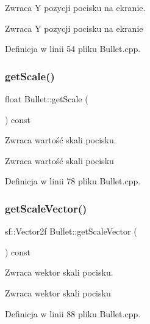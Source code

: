 Zwraca Y pozycji pocisku na ekranie. 

\begin{DoxyReturn}{Zwraca}
Y pozycji pocisku na ekranie 
\end{DoxyReturn}


Definicja w linii 54 pliku Bullet.\+cpp.

\mbox{\label{class_bullet_a252b146bfd709799990523fcbb0c6a4b}} 
\subsubsection{\texorpdfstring{get\+Scale()}{getScale()}}
{\footnotesize\ttfamily float Bullet\+::get\+Scale (\begin{DoxyParamCaption}{ }\end{DoxyParamCaption}) const}



Zwraca wartość skali pocisku. 

\begin{DoxyReturn}{Zwraca}
wartość skali pocisku 
\end{DoxyReturn}


Definicja w linii 78 pliku Bullet.\+cpp.

\mbox{\label{class_bullet_a506586cdb96da5f682ea48139627096d}} 
\subsubsection{\texorpdfstring{get\+Scale\+Vector()}{getScaleVector()}}
{\footnotesize\ttfamily sf\+::\+Vector2f Bullet\+::get\+Scale\+Vector (\begin{DoxyParamCaption}{ }\end{DoxyParamCaption}) const}



Zwraca wektor skali pocisku. 

\begin{DoxyReturn}{Zwraca}
wektor skali pocisku 
\end{DoxyReturn}


Definicja w linii 88 pliku Bullet.\+cpp.

\mbox{\label{class_bullet_a6808b8e55c477d41e24adc92d7726ad2}} 
